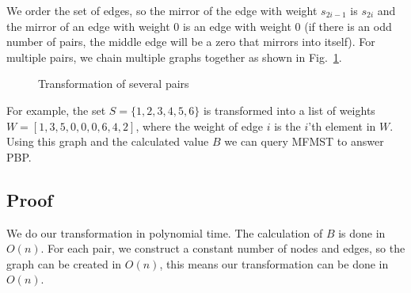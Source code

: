 We order the set of edges, so the mirror of the edge with weight $s_{2i-1}$ is $s_{2i}$ and the mirror of an edge with weight 0 is an edge with weight 0 (if there is an odd number of pairs, the middle edge will be a zero that mirrors into itself). For multiple pairs, we chain multiple graphs together as shown in Fig.~\ref{fig:transform2}. 
\begin{figure}[htb]
\centering
{}
\caption{Transformation of several pairs}
\label{fig:transform2}
\end{figure}

For example, the set $S=\lbrace 1,2,3,4,5,6 \rbrace$ is transformed into a list of weights $W=[1,3,5,0,0,0,6,4,2]$, where the weight of edge $i$ is the $i$'th element in $W$.
\noindent
Using this graph and the calculated value $B$ we can query MFMST to answer PBP.

\subsection{Proof}

We do our transformation in polynomial time. The calculation of $B$ is done in $O(n)$. For each pair, we construct a constant number of nodes and edges, so the graph can be created in $O(n)$, this means our transformation can be done in $O(n)$.

